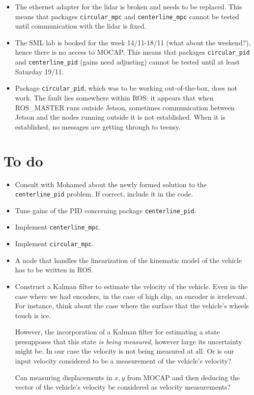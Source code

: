 \documentclass[oneside,12pt]{article}
\begin{document}
\begin{itemize}
  \item The ethernet adapter for the lidar is broken and needs to be replaced.
    This means that packages \texttt{circular\_mpc} and \texttt{centerline\_mpc}
    cannot be tested until communication with the lidar is fixed.
  \item The SML lab is booked for the week 14/11-18/11 (what about the weekend?),
    hence there is no access to MOCAP. This means that packages
    \texttt{circular\_pid} and \texttt{centerline\_pid} (gains need adjusting)
    cannot be tested until at least Saturday 19/11.
  \item Package \texttt{circular\_pid}, which was to be working out-of-the-box,
    does not work. The fault lies somewhere within ROS: it appears that when
    ROS\_MASTER runs outside Jetson, sometimes communication between Jetson and the
    nodes running outside it is not established. When it is established, no
    messages are getting through to teensy.
\end{itemize}


\section{To do}

\begin{itemize}
  \item Consult with Mohamed about the newly formed solution to the
    \texttt{centerline\_pid} problem. If correct, include it in the code.
  \item Tune gains of the PID concerning package \texttt{centerline\_pid}.
  \item Implement \texttt{centerline\_mpc}.
  \item Implement \texttt{circular\_mpc}.
  \item A node that handles the linearization of the kinematic model of the
    vehicle has to be written in ROS.
  \item Construct a Kalman filter to estimate the velocity of the vehicle.
    Even in the case where we had encoders, in the case of high slip, an
    encoder is irrelevant. For instance, think about the case where the
    surface that the vehicle's wheels touch is ice.

    However, the incorporation of a Kalman filter for estimating a state
    presupposes that this state \textit{is being measured}, however large its
    uncertainty might be. In our case the velocity is not being measured at all.
    Or is our input velocity considered to be a measurement of the vehicle's
    velocity?

    Can measuring displacements in $x,y$ from MOCAP and then deducing
    the vector of the vehicle's velocity be considered as velocity measurements?

\end{itemize}
\end{document}
